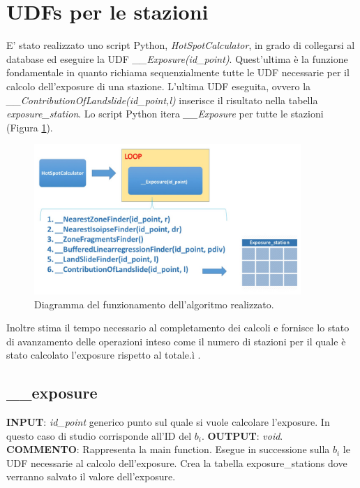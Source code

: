 \section{UDFs per le stazioni}
E' stato realizzato uno script Python, \textit{HotSpotCalculator}, in grado di collegarsi al database ed eseguire la UDF  \textit{\_\_Exposure(id\_point)}. Quest'ultima è la funzione fondamentale in quanto richiama sequenzialmente tutte le UDF necessarie per il calcolo dell'exposure di una stazione. L'ultima UDF eseguita, ovvero la \textit{\_\_ContributionOfLandslide(id\_point,l)} inserisce il risultato nella tabella \textit{exposure\_station}.
Lo script Python itera \textit{\_\_Exposure} per tutte le stazioni (Figura \ref{diagramma_algoritmo}).  

\begin{figure}[h]
	\centering
	\includegraphics[width=0.9\textwidth]{images/algorithm}
	\caption{Diagramma del funzionamento dell'algoritmo realizzato.}
	\label{diagramma_algoritmo}
\end{figure}

Inoltre stima il tempo necessario al completamento dei calcoli e fornisce lo stato di avanzamento delle operazioni inteso come il numero di stazioni per il quale è stato calcolato l'exposure rispetto al totale.ì .



\subsection{\_\_exposure}
\textbf{INPUT}: \textit{id\_point} generico punto sul quale si vuole calcolare l'exposure. In questo caso di studio corrisponde all'ID del $b_i$.\newline
\textbf{OUTPUT}: \textit{void}. \newline
\textbf{COMMENTO}: Rappresenta la main function. Esegue in successione sulla $b_i$ le UDF necessarie al calcolo dell'exposure. Crea la tabella exposure\_stations dove verranno salvato il valore dell'exposure.   

